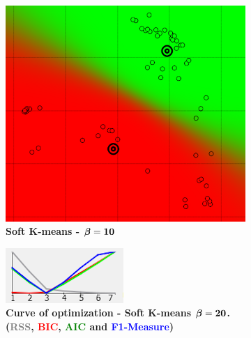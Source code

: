 \begin{figure} [h]
\centering
	\begin{subfigure}[t]{0.25\textwidth}
    \centering
	\includegraphics[height=0.15\textheight]{./clustering/opt_BIC_k_soft_beta_20_range7.png}
	\caption{\bf Soft K-means - $\boldsymbol \beta \bf = 10$}
	\end{subfigure}
    \hspace{20mm}
    \begin{subfigure}[t]{0.50\textwidth}
    \centering
	\includegraphics[height=0.15\textheight]{./clustering/curve_opt_BIC_k_soft_beta_20_range7.png}
	\caption{\bf Curve of optimization - Soft K-means $\boldsymbol \beta \bf = 20$. (\textcolor{gray}{RSS}, \textcolor{red}{BIC}, \textcolor{green}{AIC} and \textcolor{blue}{F1-Measure})}
	\end{subfigure}\\
    \begin{subfigure}[t]{0.25\textwidth}
    \centering

\end{subfigure}
\end{figure}
